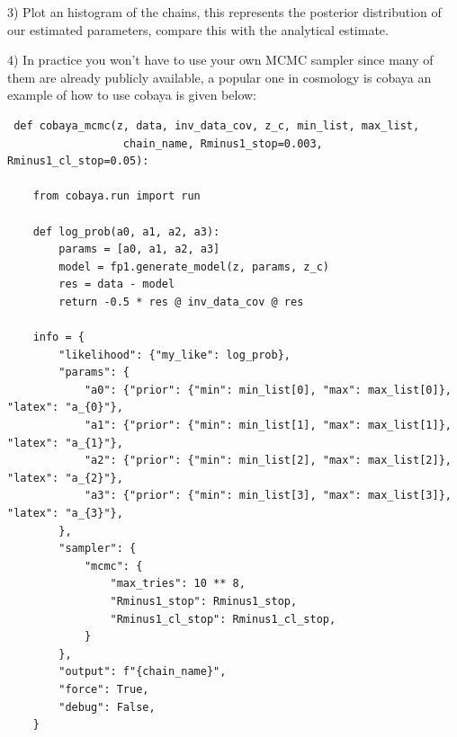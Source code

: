 \documentclass[a4paper]{article}
\newcommand{\subscript}[2]{$#1 _ #2$}
\begin{document}
\begin{enumerate}[label=(\subscript{I}{{\arabic*}})]
3) Plot an histogram of the chains, this represents the posterior distribution of our estimated parameters, compare this with the analytical estimate.

4) In practice you won't have to use your own MCMC sampler since many of them are already publicly available, a popular one in cosmology is cobaya an example of how to use cobaya is given below:
 
 



\lstset{style=mystyle}



 \begin{lstlisting}
 def cobaya_mcmc(z, data, inv_data_cov, z_c, min_list, max_list, 
 			      chain_name, Rminus1_stop=0.003, Rminus1_cl_stop=0.05):

    from cobaya.run import run

    def log_prob(a0, a1, a2, a3):
        params = [a0, a1, a2, a3]
        model = fp1.generate_model(z, params, z_c)
        res = data - model
        return -0.5 * res @ inv_data_cov @ res

    info = {
        "likelihood": {"my_like": log_prob},
        "params": {
            "a0": {"prior": {"min": min_list[0], "max": max_list[0]}, "latex": "a_{0}"},
            "a1": {"prior": {"min": min_list[1], "max": max_list[1]}, "latex": "a_{1}"},
            "a2": {"prior": {"min": min_list[2], "max": max_list[2]}, "latex": "a_{2}"},
            "a3": {"prior": {"min": min_list[3], "max": max_list[3]}, "latex": "a_{3}"},
        },
        "sampler": {
            "mcmc": {
                "max_tries": 10 ** 8,
                "Rminus1_stop": Rminus1_stop,
                "Rminus1_cl_stop": Rminus1_cl_stop,
            }
        },
        "output": f"{chain_name}",
        "force": True,
        "debug": False,
    }
    


\end{lstlisting}
\end{enumerate}
\end{document}
